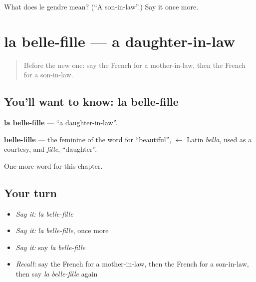 \begin{tcolorbox}[breakable,colback=teal!4,colframe=teal!35!black,title={Before you move on}]
What does le gendre mean? (\textquotedblleft{}A son-in-law\textquotedblright{}.) Say it once more.
\end{tcolorbox}
\section[la belle-fille]{la belle-fille — a daughter-in-law}

\label{lesson:FR-C167-belle-fille}



\begin{quote}
Before the new one: say the French for a mother-in-law, then the French for a son-in-law.
\end{quote}

\subsection*{You'll want to know: la belle-fille}
\textbf{la belle-fille} — \textquotedblleft{}a daughter-in-law\textquotedblright{}.

\begin{cousinweb}
\textbf{belle-fille} — the feminine of the word for \textquotedblleft{}beautiful\textquotedblright{}, $\leftarrow$ Latin \emph{bella}, used as a courtesy, and \emph{fille}, \textquotedblleft{}daughter\textquotedblright{}.
\end{cousinweb}

\begin{grammarlens}[title={What you've built}]
One more word for this chapter.
\end{grammarlens}

\subsection*{Your turn}
\begin{itemize}
\raggedright
  \item \emph{Say it:} \emph{la belle-fille}
  \item \emph{Say it:} \emph{la belle-fille}, once more
  \item \emph{Say it:} say \emph{la belle-fille}
  \item \emph{Recall:} say the French for a mother-in-law, then the French for a son-in-law, then say \emph{la belle-fille} again
\end{itemize}

